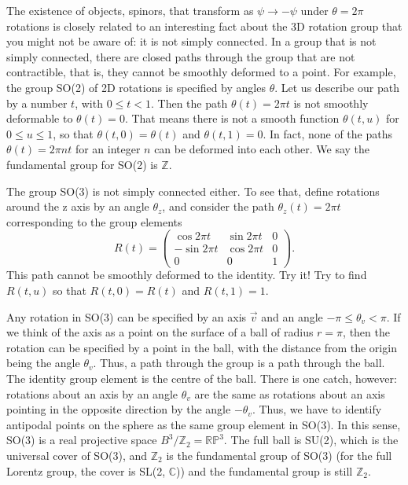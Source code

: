 \documentclass[11pt]{article}
\theoremstyle{definition}
\begin{document}
The existence of objects, spinors, that transform as \(\psi \rightarrow -\psi\) under \(\theta = 2\pi\) rotations is closely related to an interesting fact about the 3D rotation group that you might not be aware of: it is not simply connected. In a group that is not simply connected, there are closed paths through the group that are not contractible, that is, they cannot be smoothly deformed to a point. For example, the group SO(2) of 2D rotations is specified by angles \(\theta\). Let us describe our path by a number \(t\), with \(0 \leq t < 1\). Then the path \(\theta(t) = 2\pi t\) is not smoothly deformable to \(\theta(t) = 0\). That means there is not a smooth function \(\theta(t, u)\) for \(0 \leq u \leq 1\), so that \(\theta(t, 0) = \theta(t)\) and \(\theta(t, 1) = 0\). In fact, none of the paths \(\theta(t) = 2\pi nt\) for an integer \(n\) can be deformed into each other. We say the fundamental group for SO(2) is \(\mathbb{Z}\).

The group SO(3) is not simply connected either. To see that, define rotations around the z axis by an angle \(\theta_z\), and consider the path \(\theta_z(t) = 2\pi t\) corresponding to the group elements
\begin{equation}
R(t) =
\begin{pmatrix}
\cos 2\pi t & \sin 2\pi t & 0 \\
-\sin 2\pi t & \cos 2\pi t & 0 \\
0 & 0 & 1
\end{pmatrix}.
\end{equation}
This path cannot be smoothly deformed to the identity. Try it! Try to find \(R(t, u)\) so that \(R(t, 0) = R(t)\) and \(R(t, 1) = 1\).

Any rotation in SO(3) can be specified by an axis \(\vec{v}\) and an angle \(-\pi \leq \theta_v < \pi\). If we think of the axis as a point on the surface of a ball of radius \(r = \pi\), then the rotation can be specified by a point in the ball, with the distance from the origin being the angle \(\theta_v\). Thus, a path through the group is a path through the ball. The identity group element is the centre of the ball. There is one catch, however: rotations about an axis by an angle \(\theta_v\) are the same as rotations about an axis pointing in the opposite direction by the angle \(-\theta_v\). Thus, we have to identify antipodal points on the sphere as the same group element in SO(3). In this sense, SO(3) is a real projective space \(B^3/\mathbb{Z}_2 = \mathbb{RP}^3\). The full ball is SU(2), which is the universal cover of SO(3), and \(\mathbb{Z}_2\) is the fundamental group of SO(3) (for the full Lorentz group, the cover is SL(2, \(\mathbb{C}\))) and the fundamental group is still \(\mathbb{Z}_2\).
\end{document}
